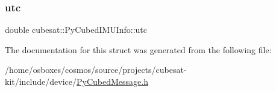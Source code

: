 \mbox{\label{structcubesat_1_1PyCubedIMUInfo_a3785744217caa5acc457d3f92cd07c7c}} 
\subsubsection{\texorpdfstring{utc}{utc}}
{\footnotesize\ttfamily double cubesat\+::\+Py\+Cubed\+I\+M\+U\+Info\+::utc}



The documentation for this struct was generated from the following file\+:\begin{DoxyCompactItemize}
\item 
/home/osboxes/cosmos/source/projects/cubesat-\/kit/include/device/\hyperlink{PyCubedMessage_8h}{Py\+Cubed\+Message.\+h}\end{DoxyCompactItemize}
